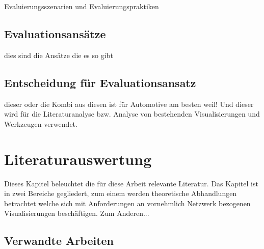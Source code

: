\documentclass[draft=false
              ,paper=a4
              ,twoside=false
              ,fontsize=11pt
              ,headsepline
              ,BCOR10mm
              ,DIV11
              ]{scrbook}
\newcommand{\TODO}[1]{\colorbox{yellow}{\textcolor{red}{[TODO: #1]}}}
\begin{document}
Evaluierungsszenarien und Evaluierungspraktiken

\fi

\section{Evaluationsansätze} %
\label{sec:evaluationsansätze}
dies sind die Ansätze die es so gibt

\section{Entscheidung für Evaluationsansatz} %
\label{sec:entscheidung_für_evaluationsansatz}
dieser oder die Kombi aus diesen ist für Automotive am besten weil! Und dieser wird für die Literaturanalyse bzw. Analyse von bestehenden Visualisierungen und Werkzeugen verwendet.


\chapter{Literaturauswertung} %
\label{cha:literaturauswertung}

Dieses Kapitel beleuchtet die für diese Arbeit relevante Literatur. Das Kapitel ist in zwei Bereiche gegliedert, zum einem werden theoretische Abhandlungen betrachtet welche sich mit Anforderungen an vornehmlich Netzwerk bezogenen Visualisierungen beschäftigen. Zum Anderen...

\section{Verwandte Arbeiten} %
\label{sec:verwandte_arbeiten}

\end{document}
